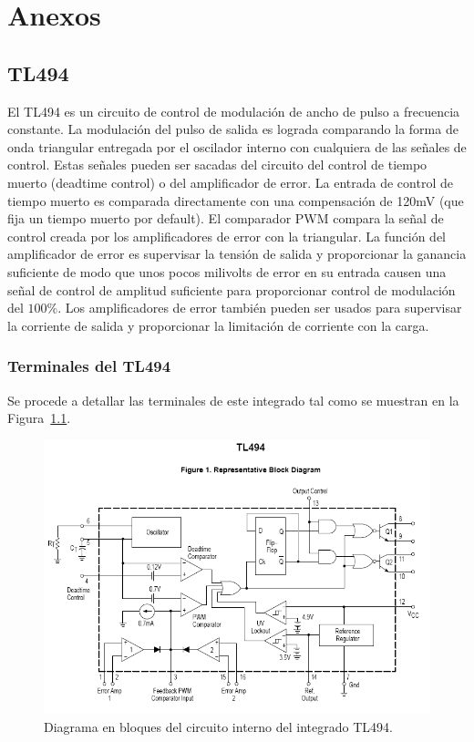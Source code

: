 \section{Anexos}
\bigskip
\subsection{TL494}\label{TL494}

El TL494 es un circuito de control de modulación de ancho de pulso a frecuencia constante. La modulación del pulso de salida es lograda comparando la forma de onda triangular entregada por el oscilador interno con cualquiera de las señales de control. Estas señales pueden ser sacadas del circuito del control de tiempo muerto (deadtime control) o del amplificador de error. La entrada de control de tiempo muerto es comparada directamente con una compensación de 120mV (que fija un tiempo muerto por default). El comparador PWM compara la señal de control creada por los amplificadores de error con la triangular. La función del amplificador de error es supervisar la tensión de salida y proporcionar la ganancia suficiente de modo que unos pocos milivolts de error en su entrada causen una señal de control de amplitud suficiente para proporcionar control de modulación del $100\% $. Los amplificadores de error también pueden ser usados para supervisar la corriente de salida y proporcionar la limitación de corriente con la carga.

\subsubsection{Terminales del TL494}

Se procede a detallar las terminales de este integrado tal como se muestran en la Figura~\ref{TL494}.

\begin{figure}[H]
\centering
\includegraphics[width=\textwidth]{img/tl494.png}
\caption{Diagrama en bloques del circuito interno del integrado TL494.}
\label{tl494}
\end{figure}

